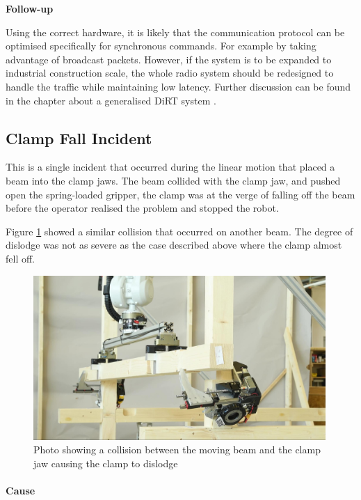 \textbf{Follow-up}

Using the correct hardware, it is likely that the communication protocol can be optimised specifically for synchronous commands. For example by taking advantage of broadcast packets. However, if the system is to be expanded to industrial construction scale, the whole radio system should be redesigned to handle the traffic while maintaining low latency. Further discussion can be found in the chapter about a generalised DiRT system . 

\subsection{Clamp Fall Incident}
\label{subsection:exploration-5-clamp-fall-incident}

This is a single incident that occurred during the linear motion that placed a beam into the clamp jaws. The beam collided with the clamp jaw, and pushed open the spring-loaded gripper, the clamp was at the verge of falling off the beam before the operator realised the problem and stopped the robot.

Figure \ref{fig:collision-beam-clamp-jaw} showed a similar collision that occurred on another beam. The degree of dislodge was not as severe as the case described above where the clamp almost fell off.

\begin{figure}[!h]
    \centering
    \includegraphics[width=0.99\textwidth]{images/08/img40.jpg}
    \caption{Photo showing a collision between the moving beam and the clamp jaw causing the clamp to dislodge}
    \label{fig:collision-beam-clamp-jaw}
\end{figure}


\paragraph{Cause}

